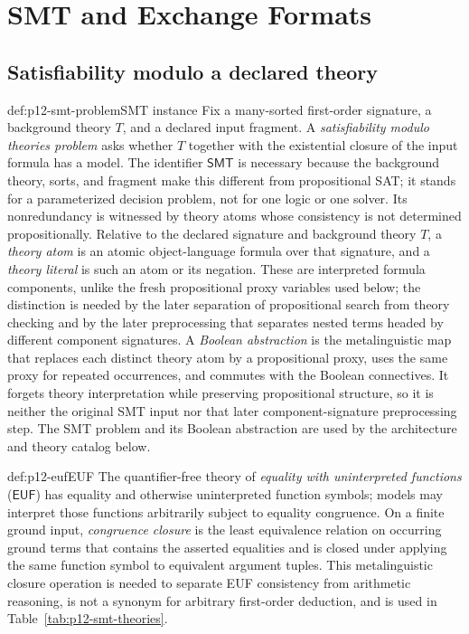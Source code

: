 \chapter{SMT and Exchange Formats}
\label{sec:p12-smt-and-exchange-formats}

\section{Satisfiability modulo a declared theory}

\begin{hbdefinition}{def:p12-smt-problem}{SMT instance}
Fix a many-sorted first-order signature, a background theory \(T\), and a
declared input fragment.  A \emph{satisfiability modulo theories problem}
asks whether \(T\) together with the existential closure of the input formula
has a model.  The identifier \(\mathsf{SMT}\) is necessary because the
background theory, sorts, and fragment make this different from propositional
SAT; it stands for a parameterized decision problem, not for one logic or one
solver.  Its nonredundancy is witnessed by theory atoms whose consistency is
not determined propositionally.  Relative to the declared signature and
background theory \(T\), a \emph{theory atom} is an atomic object-language
formula over that signature, and a \emph{theory literal} is such an atom or
its negation.  These are interpreted formula components, unlike the fresh
propositional proxy variables used below; the distinction is needed by the
later separation of propositional search from theory checking and by the
later preprocessing that separates nested terms headed by different
component signatures.  A \emph{Boolean
abstraction} is the metalinguistic map that replaces each distinct theory atom
by a propositional proxy, uses the same proxy for repeated occurrences, and
commutes with the Boolean connectives.  It forgets theory interpretation while
preserving propositional structure, so it is neither the original SMT input
nor that later component-signature preprocessing step.  The SMT problem and its Boolean
abstraction are used by the architecture and theory catalog below.
\end{hbdefinition}

\begin{hbdefinition}{def:p12-euf}{EUF}
The quantifier-free theory of \emph{equality with uninterpreted functions}
(\(\mathsf{EUF}\)) has equality and otherwise uninterpreted function symbols;
models may interpret those functions arbitrarily subject to equality
congruence.  On a finite ground input, \emph{congruence closure} is the least
equivalence relation on occurring ground terms that contains the asserted
equalities and is closed under applying the same function symbol to equivalent
argument tuples.  This metalinguistic closure operation is needed to separate
EUF consistency from arithmetic reasoning, is not a synonym for arbitrary
first-order deduction, and is used in Table~\ref{tab:p12-smt-theories}.
\end{hbdefinition}

